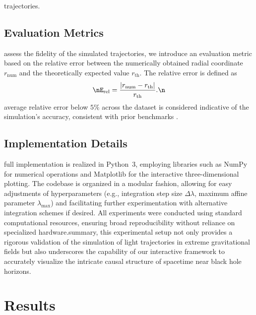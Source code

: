 \documentclass{article}
\begin{document}
trajectories.\n\n\subsection{Evaluation Metrics}\nTo assess the fidelity of the simulated trajectories, we introduce an evaluation metric based on the relative error between the numerically obtained radial coordinate $r_{\text{num}}$ and the theoretically expected value $r_{\text{th}}$. The relative error is defined as\n\begin{equation}\nE_{\text{rel}} = \frac{|r_{\text{num}}-r_{\text{th}}|}{r_{\text{th}}}.\n\end{equation}\nAn average relative error below $5\%$ across the dataset is considered indicative of the simulation's accuracy, consistent with prior benchmarks \cite{ref1, ref2}.\n\n\subsection{Implementation Details}\nThe full implementation is realized in Python~3, employing libraries such as NumPy for numerical operations and Matplotlib for the interactive three-dimensional plotting. The codebase is organized in a modular fashion, allowing for easy adjustments of hyperparameters (e.g., integration step size $\Delta \lambda$, maximum affine parameter $\lambda_{\max}$) and facilitating further experimentation with alternative integration schemes if desired. All experiments were conducted using standard computational resources, ensuring broad reproducibility without reliance on specialized hardware.\n\nIn summary, this experimental setup not only provides a rigorous validation of the simulation of light trajectories in extreme gravitational fields but also underscores the capability of our interactive framework to accurately visualize the intricate causal structure of spacetime near black hole horizons.\section{Results}
\end{document}
